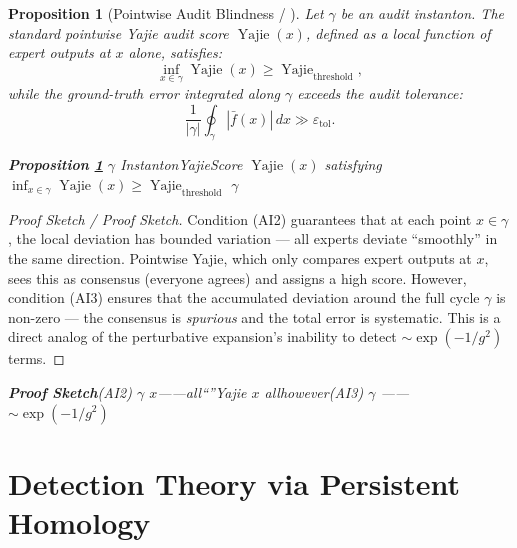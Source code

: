 \documentclass[11pt,a4paper]{article}
\theoremstyle{plain}
\newtheorem{proposition}[theorem]{Proposition}
\theoremstyle{definition}
\DeclareMathOperator{\Yajie}{Yajie}
\begin{document}
\begin{proposition}[Pointwise Audit Blindness / ]
\label{prop:blindness}
Let $\gamma$ be an audit instanton. The standard pointwise Yajie audit 
score $\Yajie(x)$, defined as a local function of expert outputs at $x$ 
alone, satisfies:
\begin{equation}
  \inf_{x \in \gamma} \Yajie(x) \geq \Yajie_{\text{threshold}},
  \label{eq:blindness}
\end{equation}
while the \emph{ground-truth error} integrated along $\gamma$ exceeds the 
audit tolerance:
\begin{equation}
  \frac{1}{|\gamma|} \oint_{\gamma} |\bar{f}(x)| \, dx \gg \varepsilon_{\text{tol}}.
  \label{eq:error}
\end{equation}
\end{proposition}

\bigskip
\noindent
\textit{\textbf{Proposition \ref{prop:blindness}} $\gamma$ InstantonYajieScore $\Yajie(x)$ satisfying $\inf_{x \in \gamma} \Yajie(x) \geq \Yajie_{\text{threshold}}$ $\gamma$ \textbf{}}

\begin{proof}[Proof Sketch / Proof Sketch]
Condition (AI2) guarantees that at each point $x \in \gamma$, the local 
deviation has bounded variation — all experts deviate ``smoothly'' in the 
same direction. Pointwise Yajie, which only compares expert outputs at $x$, 
sees this as consensus (everyone agrees) and assigns a high score. However, 
condition (AI3) ensures that the accumulated deviation around the full 
cycle $\gamma$ is non-zero — the consensus is \emph{spurious} and the 
total error is systematic. This is a direct analog of the perturbative 
expansion's inability to detect $\sim \exp(-1/g^2)$ terms.
\end{proof}

\bigskip
\noindent
\textit{\textbf{Proof Sketch}(AI2) $\gamma$  $x$——all``''Yajie $x$ allhowever(AI3) $\gamma$ ——\textbf{} $\sim \exp(-1/g^2)$ }

\section{Detection Theory via Persistent Homology}
\section*{}
\end{document}
